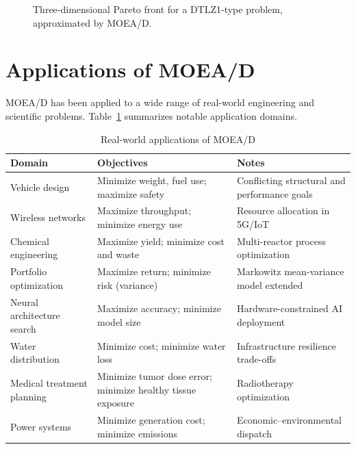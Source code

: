\documentclass[12pt,a4paper]{article}
\begin{document}
\begin{figure}[H]
\centering
{}
\caption{Three-dimensional Pareto front for a DTLZ1-type problem, approximated by MOEA/D.}
\label{fig:3d_pareto}
\end{figure}

\section{Applications of MOEA/D}
\label{sec:applications}

MOEA/D has been applied to a wide range of real-world engineering and scientific problems. Table~\ref{tab:applications} summarizes notable application domains.

\begin{table}[H]
\centering
\caption{Real-world applications of MOEA/D}
\label{tab:applications}
\renewcommand{\arraystretch}{1.3}
\begin{tabular}{p{3.5cm} p{4cm} p{5.5cm}}
\toprule
\textbf{Domain} & \textbf{Objectives} & \textbf{Notes} \\
\midrule
Vehicle design & Minimize weight, fuel use; maximize safety & Conflicting structural and performance goals \\
Wireless networks & Maximize throughput; minimize energy use & Resource allocation in 5G/IoT \\
Chemical engineering & Maximize yield; minimize cost and waste & Multi-reactor process optimization \\
Portfolio optimization & Maximize return; minimize risk (variance) & Markowitz mean-variance model extended \\
Neural architecture search & Maximize accuracy; minimize model size & Hardware-constrained AI deployment \\
Water distribution & Minimize cost; minimize water loss & Infrastructure resilience trade-offs \\
Medical treatment planning & Minimize tumor dose error; minimize healthy tissue exposure & Radiotherapy optimization \\
Power systems & Minimize generation cost; minimize emissions & Economic--environmental dispatch \\
\bottomrule
\end{tabular}
\end{table}
\end{document}
